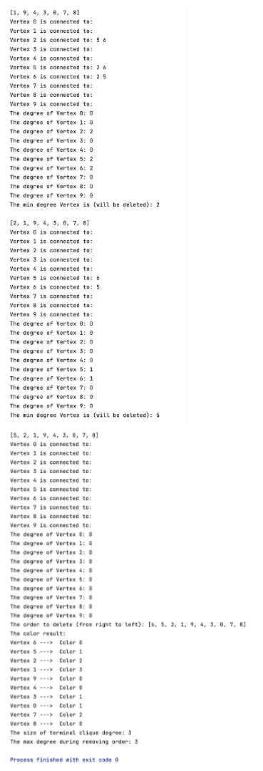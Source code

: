 \documentclass{article}
\begin{document}
\begin{enumerate}
\begin{center}
        \includegraphics[width=0.5\textwidth]{p31.png}
        \includegraphics[width=0.7\textwidth]{p32.png}
    \end{center}
    

\end{enumerate}
\end{document}
